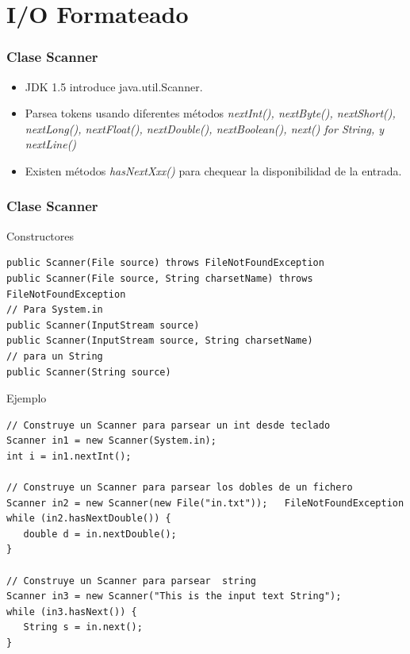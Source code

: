 \documentclass{beamer}
\begin{document}
\section{I/O Formateado}
\begin{frame}[fragile]
\frametitle{Clase Scanner}
\begin{itemize}[<+->]
\item JDK 1.5 introduce java.util.Scanner.
\item Parsea tokens usando diferentes métodos \emph{nextInt(), nextByte(), nextShort(), nextLong(), nextFloat(), nextDouble(), nextBoolean(), next() for String, y nextLine()}
\item Existen métodos \emph{hasNextXxx()} para chequear la disponibilidad de la entrada.
\end{itemize}
\end{frame}


\begin{frame}[fragile]
\frametitle{Clase Scanner}
\begin{tiny}

\begin{block}{Constructores}
\begin{verbatim}
public Scanner(File source) throws FileNotFoundException
public Scanner(File source, String charsetName) throws FileNotFoundException
// Para System.in
public Scanner(InputStream source)
public Scanner(InputStream source, String charsetName)
// para un String
public Scanner(String source)
\end{verbatim}
\end{block}
\pause
\begin{block}{Ejemplo}
\begin{verbatim}
// Construye un Scanner para parsear un int desde teclado
Scanner in1 = new Scanner(System.in);
int i = in1.nextInt();
 
// Construye un Scanner para parsear los dobles de un fichero
Scanner in2 = new Scanner(new File("in.txt"));   FileNotFoundException
while (in2.hasNextDouble()) {
   double d = in.nextDouble();
}
 
// Construye un Scanner para parsear  string
Scanner in3 = new Scanner("This is the input text String");
while (in3.hasNext()) {
   String s = in.next();
}
\end{verbatim}
\end{block}
\end{tiny}
\end{frame}
\end{document}
